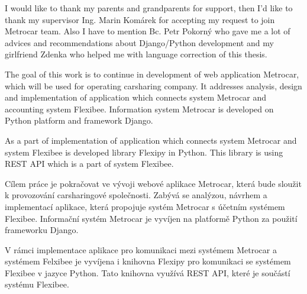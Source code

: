 \documentclass[11pt,twoside,a4paper]{book}
\begin{document}
\acknowledgements
\noindent
I would like to thank my parents and grandparents for support, then I'd like to thank my supervisor Ing. Marin Komárek for 
accepting my request to join Metrocar team. Also I have to mention Bc. Petr Pokorný who gave me a lot of advices and recommendations about Django/Python development and my girlfriend Zdenka who helped me with language correction of this thesis.





 
\abstractpage

The goal of this work is to continue in development of web application Metrocar, which will be used for operating 
carsharing company. It addresses analysis, design and implementation of application which connects system Metrocar and 
accounting system Flexibee. Information system Metrocar is developed on Python platform and framework Django.

As a part of implementation of application which connects system Metrocar and system Flexibee is developed library Flexipy in Python.
This library is using REST API which is a part of system Flexibee.   

\baselineskip

\noindent
Cílem práce je pokračovat ve vývoji webové aplikace Metrocar, která bude sloužit k provozování carsharingové společnosti. Zabývá se 
analýzou, návrhem a implementací aplikace, která propojuje systém Metrocar s účetním systémem Flexibee. Informační systém Metrocar 
je vyvíjen na platformě Python za použití frameworku Django. 

V rámci implementace aplikace pro komunikaci mezi systémem Metrocar a 
systémem Felxibee je vyvíjena i knihovna Flexipy pro komunikaci se systémem Flexibee v jazyce Python. Tato knihovna využívá 
REST API, které je součástí systému Flexibee. 


\tableofcontents



\listoffigures
\end{document}
